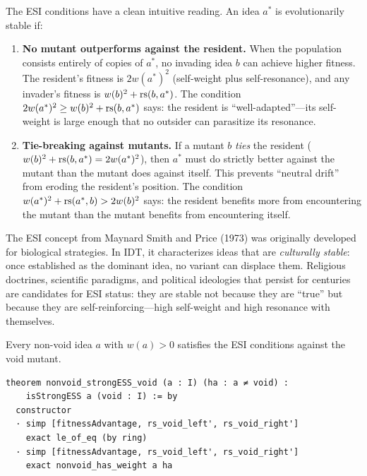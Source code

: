 \begin{remark}
\label{rem:esi-intuition}
The ESI conditions have a clean intuitive reading.  An idea $a^*$ is
evolutionarily stable if:

\begin{enumerate}
  \item \textbf{No mutant outperforms against the resident.}  When the
        population consists entirely of copies of $a^*$, no invading idea $b$
        can achieve higher fitness.  The resident's fitness is $2w(a^*)^2$
        (self-weight plus self-resonance), and any invader's fitness is
        $w(b)^2 + \mathrm{rs}(b, a^*)$.  The condition $2w(a^*)^2 \geq w(b)^2 +
        \mathrm{rs}(b, a^*)$ says: the resident is ``well-adapted''---its self-weight
        is large enough that no outsider can parasitize its resonance.

  \item \textbf{Tie-breaking against mutants.}  If a mutant $b$ \emph{ties}
        the resident ($w(b)^2 + \mathrm{rs}(b, a^*) = 2w(a^*)^2$), then $a^*$ must
        do strictly better against the mutant than the mutant does against
        itself.  This prevents ``neutral drift'' from eroding the resident's
        position.  The condition $w(a^*)^2 + \mathrm{rs}(a^*, b) > 2w(b)^2$ says:
        the resident benefits more from encountering the mutant than the
        mutant benefits from encountering itself.
\end{enumerate}

The ESI concept from Maynard Smith and Price (1973) was originally developed
for biological strategies.  In IDT, it characterizes ideas that are
\emph{culturally stable}: once established as the dominant idea, no variant
can displace them.  Religious doctrines, scientific paradigms, and political
ideologies that persist for centuries are candidates for ESI status: they
are stable not because they are ``true'' but because they are
self-reinforcing---high self-weight and high resonance with themselves.
\end{remark}

\begin{theorem}
\label{thm:nonvoid-vs-void-ess}
Every non-void idea $a$ with $w(a) > 0$ satisfies the ESI conditions against
the void mutant.

\begin{lstlisting}[caption={Lean 4: Non-void ideas are ESS against void}]
theorem nonvoid_strongESS_void (a : I) (ha : a ≠ void) :
    isStrongESS a (void : I) := by
  constructor
  · simp [fitnessAdvantage, rs_void_left', rs_void_right']
    exact le_of_eq (by ring)
  · simp [fitnessAdvantage, rs_void_left', rs_void_right']
    exact nonvoid_has_weight a ha
\end{lstlisting}
\end{theorem}

